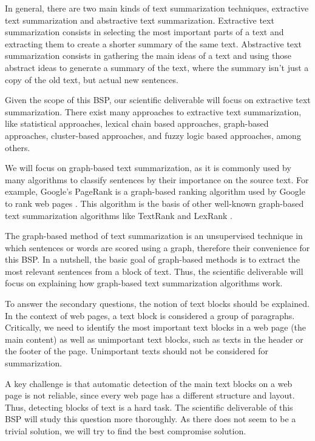 \documentclass[conference,compsoc]{IEEEtran}
\begin{document}
In general, there are two main kinds of text summarization techniques, extractive text summarization and abstractive text summarization. Extractive text summarization consists in selecting the most important parts of a text and extracting them to create a shorter summary of the same text. Abstractive text summarization consists in gathering the main ideas of a text and using those abstract ideas to generate a summary of the text, where the summary isn't just a copy of the old text, but actual new sentences.

Given the scope of this BSP, our scientific deliverable will focus on extractive text summarization. There exist many approaches to extractive text summarization, like statistical approaches, lexical chain based approaches, graph-based approaches, cluster-based approaches, and fuzzy logic based approaches, among others.

We will focus on graph-based text summarization, as it is commonly used by many algorithms to classify sentences by their importance on the source text. For example, Google's PageRank is a graph-based ranking algorithm used by Google to rank web pages \cite{page1999pagerank}. This algorithm is the basis of other well-known graph-based text summarization algorithms like TextRank \cite{mihalcea2004textrank} and LexRank \cite{erkan2004lexrank}.

The graph-based method of text summarization is an unsupervised technique in which sentences or words are scored using a graph, therefore their convenience for this BSP. In a nutshell, the basic goal of graph-based methods is to extract the most relevant sentences from a block of text. Thus, the scientific deliverable will focus on explaining how graph-based text summarization algorithms work.

To answer the secondary questions, the notion of text blocks should be explained. In the context of web pages, a text block is considered a group of paragraphs. Critically, we need to identify the most important text blocks in a web page (the main content) as well as unimportant text blocks, such as texts in the header or the footer of the page. Unimportant texts should not be considered for summarization.

A key challenge is that automatic detection of the main text blocks on a web page is not reliable, since every web page has a different structure and layout. Thus, detecting blocks of text is a hard task. The scientific deliverable of this BSP will study this question more thoroughly. As there does not seem to be a trivial solution, we will try to find the best compromise solution.
\end{document}
